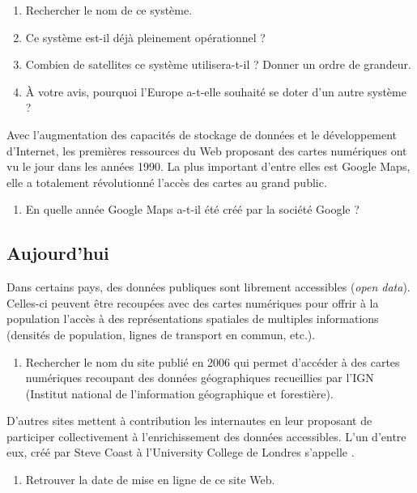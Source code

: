 \documentclass[a4paper]{article}
\newlength{\stextwidth} %
\newcommand{\guess}[1]{\ifthenelse{\boolean{reveal}}{{\color{red}#1}}{\settowidth{\stextwidth}{#1}\makebox[\stextwidth]{\dotfill}}}
\begin{document}
\begin{enumerate}[resume]
  \item Rechercher le nom de ce système.
  \item Ce système est-il déjà pleinement opérationnel ?
  \item Combien de satellites ce système utilisera-t-il ? Donner un ordre de grandeur.
  \item À votre avis, pourquoi l'Europe a-t-elle souhaité se doter d'un autre système ?
\end{enumerate}

Avec l'augmentation des capacités de stockage de données et le développement d'Internet, les premières ressources du Web proposant des cartes numériques ont vu le jour dans les années 1990. La plus important d'entre elles est Google Maps, elle a totalement révolutionné l'accès des cartes au grand public.

\begin{enumerate}[resume]
  \item En quelle année Google Maps a-t-il été créé par la société Google ?
\end{enumerate}

\subsection*{Aujourd'hui}
Dans certains pays, des données publiques sont librement accessibles (\textit{open data}). Celles-ci peuvent être recoupées avec des cartes numériques pour offrir à la population l'accès à des représentations spatiales de multiples informations (densités de population, lignes de transport en commun, etc.).

\begin{enumerate}[resume]
  \item Rechercher le nom du site publié en 2006 qui permet d'accéder à des cartes numériques recoupant des données géographiques recueillies par l'IGN (Institut national de l'information géographique et forestière).
\end{enumerate}

D'autres sites mettent à contribution les internautes en leur proposant de participer collectivement à l'enrichissement des données accessibles. L'un d'entre eux, créé par Steve Coast à l'University College de Londres s'appelle \guess{OpenStreetMap}.

\begin{enumerate}[resume]
  \item Retrouver la date de mise en ligne de ce site Web.
\end{enumerate}
\end{document}
